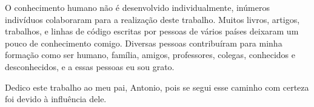 \begin{agradecimentos}
	

    O conhecimento humano não é desenvolvido individualmente, inúmeros indivíduos colaboraram para a realização deste trabalho.
    Muitos livros, artigos, trabalhos, e linhas de código escritas por pessoas de vários países deixaram um pouco de conhecimento comigo.
    Diversas pessoas contribuíram para minha formação como ser humano, família, amigos, professores, colegas, conhecidos e desconhecidos, e a essas pessoas eu sou grato.

    Dedico este trabalho ao meu pai, Antonio, pois se segui esse caminho com certeza foi devido à influência dele.

\end{agradecimentos}